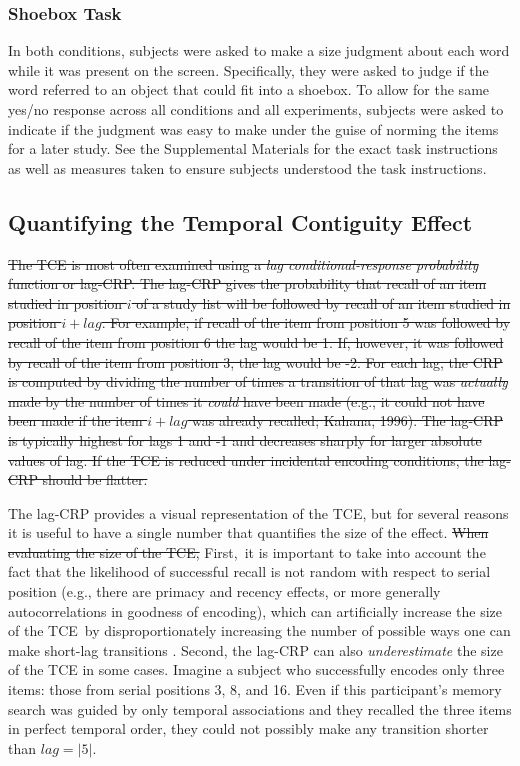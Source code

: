 \documentclass[man,natbib,floatsintext]{apa6} %
\begin{document}
\subsubsection{Shoebox Task} In both conditions, subjects were asked to make a size judgment about each word while it was present on the screen. Specifically, they were asked  to judge if the word referred to an object that could fit into a shoebox. To allow for the same yes/no response across all conditions and all experiments, subjects were asked to indicate if the judgment was easy to make under the guise of norming the items for a later study. See the Supplemental Materials for the exact task instructions as well as measures taken to ensure subjects understood the task instructions.

\subsection{Quantifying the Temporal Contiguity Effect} \st{The TCE is most often examined using a \textit{lag conditional-response probability} function or lag-CRP. The lag-CRP gives the probability that recall of an item studied in position $i$ of a study list will be followed by recall of an item studied in position $i+lag$. For example, if recall of the item from position 5 was followed by recall of the item from position 6 the lag would be 1. If, however, it was followed by recall of the item from position 3, the lag would be -2. For each lag, the CRP is computed by dividing the number of times a transition of that lag was \emph{actually} made by the number of times it \emph{could} have been made (e.g., it could not have been made if the item $i+lag$ was already recalled; Kahana, 1996). The lag-CRP is typically highest for lags 1 and -1 and decreases sharply for larger absolute values of lag. If the TCE is reduced under incidental encoding conditions, the lag-CRP should be flatter.}

The lag-CRP provides a visual representation of the TCE, but for several reasons it is useful to have a single number that quantifies the size of the effect. \st{When evaluating the size of the TCE,} \color{red}First,\color{black}~it is important to take into account the fact that the likelihood of successful recall is not random with respect to serial position (e.g., there are primacy and recency effects, or more generally autocorrelations in goodness of encoding), which can artificially increase the size of the TCE\color{red}~by disproportionately increasing the number of possible ways one can make short-lag transitions \citep{HealKaha17,Hint16}. Second, the lag-CRP can also \emph{underestimate} the size of the TCE in some cases. Imagine a subject who successfully encodes only three items: those from serial positions 3, 8, and 16. Even if this participant's memory search was guided by only temporal associations and they recalled the three items in perfect temporal order, they could not possibly make any transition shorter than $lag=|5|$.
\end{document}
